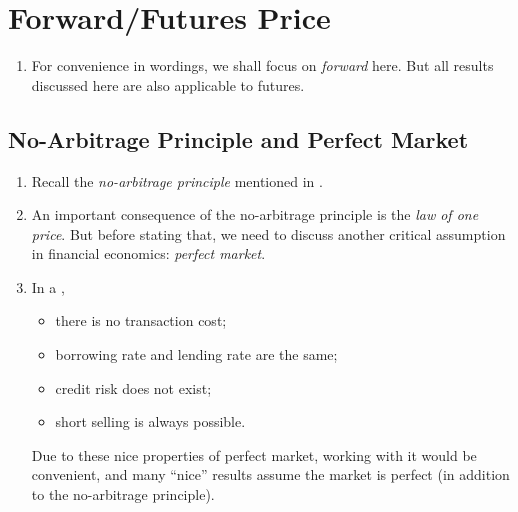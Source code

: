 \section{Forward/Futures Price}
\label{sect:fwd-futures-price}
\begin{enumerate}
\item For convenience in wordings, we shall focus on \emph{forward} here. But all
results discussed here are also applicable to futures.
\end{enumerate}
\subsection{No-Arbitrage Principle and Perfect Market}
\begin{enumerate}
\item Recall the \emph{no-arbitrage principle} mentioned in
.
\item An important consequence of the no-arbitrage principle is the \emph{law
of one price}. But before stating that, we need to discuss another critical
assumption in financial economics: \emph{perfect market}.
\item In a ,
\begin{itemize}
\item there is no transaction cost;
\item borrowing rate and lending rate are the same;
\item credit risk does not exist;
\item short selling is always possible.
\end{itemize}
Due to these nice properties of perfect market, working with it would be
convenient, and many ``nice'' results assume the market is perfect (in addition
to the no-arbitrage principle).


\end{enumerate}
